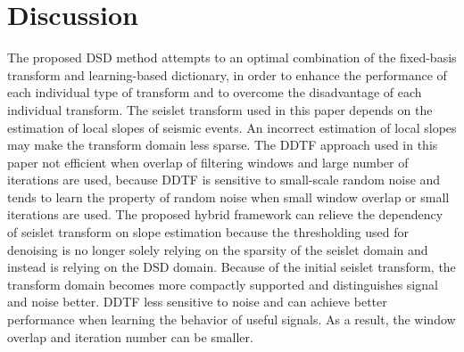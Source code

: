 \section{Discussion}
The proposed DSD method attempts to  an optimal combination of the fixed-basis transform and learning-based dictionary, in order to enhance the performance of each individual type of transform and to 
overcome the disadvantage of each individual transform. The seislet transform used in this paper  depends on the estimation of local slopes of seismic events. An incorrect estimation
of local slopes may make the transform domain less sparse. The DDTF approach used in this paper  not  efficient when  overlap of filtering windows and large number of iterations 
are used, because DDTF is sensitive to small-scale random noise and tends to learn the property of random noise when small window overlap or small  iterations  are used. 
The proposed hybrid framework can relieve the dependency of  seislet transform on slope estimation because the thresholding used for denoising is no longer solely relying on the
sparsity of the seislet domain and instead  is relying on the DSD domain. Because of the initial seislet transform, the transform domain becomes more compactly supported and 
distinguishes signal and noise better.  DDTF    less sensitive to noise and can achieve better performance when learning the behavior of useful signals. As a result, the 
window overlap and iteration number can  be smaller.


